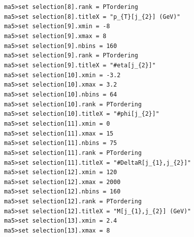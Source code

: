 \documentclass[a4paper, 10pt]{article}
\begin{document}
\texttt{ }\texttt{ }\texttt{ma5>set selection[8].rank = PTordering\\
}
\texttt{ }\texttt{ }\texttt{ma5>set selection[8].titleX = "p\_\{T\}[j\_\{2\}] (GeV)"\\
}
\texttt{ }\texttt{ }\texttt{ma5>set selection[9].xmin = -8\\
}
\texttt{ }\texttt{ }\texttt{ma5>set selection[9].xmax = 8\\
}
\texttt{ }\texttt{ }\texttt{ma5>set selection[9].nbins = 160\\
}
\texttt{ }\texttt{ }\texttt{ma5>set selection[9].rank = PTordering\\
}
\texttt{ }\texttt{ }\texttt{ma5>set selection[9].titleX = "\#eta[j\_\{2\}]"\\
}
\texttt{ }\texttt{ }\texttt{ma5>set selection[10].xmin = -3.2\\
}
\texttt{ }\texttt{ }\texttt{ma5>set selection[10].xmax = 3.2\\
}
\texttt{ }\texttt{ }\texttt{ma5>set selection[10].nbins = 64\\
}
\texttt{ }\texttt{ }\texttt{ma5>set selection[10].rank = PTordering\\
}
\texttt{ }\texttt{ }\texttt{ma5>set selection[10].titleX = "\#phi[j\_\{2\}]"\\
}
\texttt{ }\texttt{ }\texttt{ma5>set selection[11].xmin = 0\\
}
\texttt{ }\texttt{ }\texttt{ma5>set selection[11].xmax = 15\\
}
\texttt{ }\texttt{ }\texttt{ma5>set selection[11].nbins = 75\\
}
\texttt{ }\texttt{ }\texttt{ma5>set selection[11].rank = PTordering\\
}
\texttt{ }\texttt{ }\texttt{ma5>set selection[11].titleX = "\#DeltaR[j\_\{1\},j\_\{2\}]"\\
}
\texttt{ }\texttt{ }\texttt{ma5>set selection[12].xmin = 120\\
}
\texttt{ }\texttt{ }\texttt{ma5>set selection[12].xmax = 2000\\
}
\texttt{ }\texttt{ }\texttt{ma5>set selection[12].nbins = 160\\
}
\texttt{ }\texttt{ }\texttt{ma5>set selection[12].rank = PTordering\\
}
\texttt{ }\texttt{ }\texttt{ma5>set selection[12].titleX = "M[j\_\{1\},j\_\{2\}] (GeV)"\\
}
\texttt{ }\texttt{ }\texttt{ma5>set selection[13].xmin = 2.4\\
}
\texttt{ }\texttt{ }\texttt{ma5>set selection[13].xmax = 8\\
}
\end{document}
